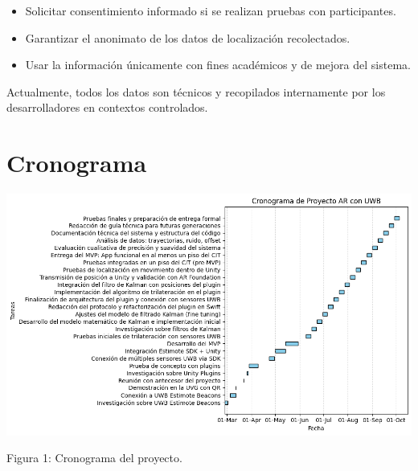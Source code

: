 \documentclass{article}
\begin{document}
\begin{itemize}
    \item Solicitar consentimiento informado si se realizan pruebas con participantes.
    \item Garantizar el anonimato de los datos de localización recolectados.
    \item Usar la información únicamente con fines académicos y de mejora del sistema.
\end{itemize}

Actualmente, todos los datos son técnicos y recopilados internamente por los desarrolladores en contextos controlados.

\newpage

\section{Cronograma}

\vspace{15mm} 
\includegraphics[width=1\textwidth]{images/cronograma2.png}
{\begin{center}
    Figura 1: Cronograma del proyecto.
\end{center}}
\newpage

    
 
\end{document}
